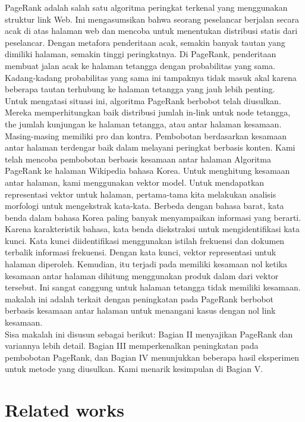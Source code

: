\documentclass[conference]{IEEEtran}
\begin{document}
PageRank 
\cite{brin1998anatomy}
adalah salah satu algoritma peringkat terkenal yang menggunakan struktur link Web. Ini mengasumsikan bahwa seorang peselancar berjalan secara acak di atas halaman web dan mencoba untuk menentukan distribusi statis dari peselancar. Dengan metafora penderitaan acak, semakin banyak tautan yang dimiliki halaman, semakin tinggi peringkatnya. Di PageRank, penderitaan membuat jalan acak ke halaman tetangga dengan probabilitas yang sama.
Kadang-kadang probabilitas yang sama ini tampaknya tidak masuk akal karena beberapa tautan terhubung ke halaman tetangga yang jauh lebih penting.\\

Untuk mengatasi situasi ini, algoritma PageRank berbobot
\cite{xing2004weighted,qiao2010simrank,kumar2011page}
telah diusulkan. Mereka memperhitungkan baik distribusi jumlah in-link untuk node tetangga, the jumlah kunjungan ke halaman tetangga, atau antar halaman kesamaan. Masing-masing memiliki pro dan kontra. Pembobotan berdasarkan kesamaan antar halaman terdengar baik dalam melayani peringkat berbasis konten.
Kami telah mencoba pembobotan berbasis kesamaan antar halaman
Algoritma PageRank ke halaman Wikipedia bahasa Korea. Untuk
menghitung kesamaan antar halaman, kami menggunakan vektor
model\cite{schutze2008introduction}. Untuk mendapatkan representasi vektor untuk halaman, pertama-tama kita
melakukan analisis morfologi untuk mengekstrak kata-kata.
Berbeda dengan bahasa barat, kata benda dalam bahasa Korea paling banyak menyampaikan
informasi yang berarti. Karena karakteristik bahasa,
kata benda diekstraksi untuk mengidentifikasi kata kunci. Kata kunci
diidentifikasi menggunakan istilah frekuensi dan dokumen terbalik
informasi frekuensi. Dengan kata kunci, vektor
representasi untuk halaman diperoleh. Kemudian, itu terjadi pada
memiliki kesamaan nol ketika kesamaan antar halaman dihitung
menggunakan produk dalam dari vektor tersebut. Ini sangat canggung untuk halaman tetangga tidak memiliki kesamaan. makalah ini adalah terkait dengan peningkatan pada PageRank berbobot berbasis kesamaan antar halaman untuk menangani kasus dengan nol link kesamaan.\\

Sisa makalah ini disusun sebagai berikut: Bagian
II menyajikan PageRank dan variannya lebih detail.
Bagian III memperkenalkan peningkatan pada pembobotan
PageRank, dan Bagian IV menunjukkan beberapa hasil eksperimen untuk
metode yang diusulkan. Kami menarik kesimpulan di Bagian V.
\section{Related works}
\end{document}
